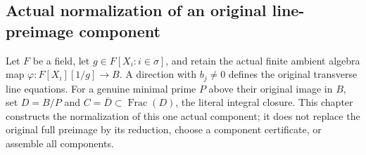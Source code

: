 \subsection{Actual normalization of an original line-preimage component}
\label{subsec:normalized-line-components}

Let $F$ be a field, let $g\in F[X_i:i\in\sigma]$, and retain the actual
finite ambient algebra map $\varphi:F[X_i][1/g]\to B$. A direction with
$b_j\ne0$ defines the original transverse line equations. For a genuine
minimal prime $P$ above their original image in $B$, set
$D=B/P$ and $C=\overline D\subset\operatorname{Frac}(D)$, the literal
integral closure. This chapter constructs the normalization of this one
actual component; it does not replace the original full preimage by its
reduction, choose a component certificate, or assemble all components.

